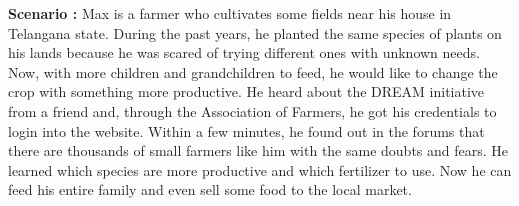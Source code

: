 \begin{flushleft}
\textbf{Scenario :} 
Max is a farmer who cultivates some fields near his house in Telangana state. During the past years, he planted the same species of plants on his lands because he was scared of trying different ones with unknown needs. Now, with more children and grandchildren to feed, he would like to change the crop with something more productive. 
He heard about the DREAM initiative from a friend and, through the Association of Farmers, he got his credentials to login into the website.
Within a few minutes, he found out in the forums that there are thousands of small farmers like him with the same doubts and fears.
He learned which species are more productive and which fertilizer to use.
Now he can feed his entire family and even sell some food to the local market.
\end{flushleft}